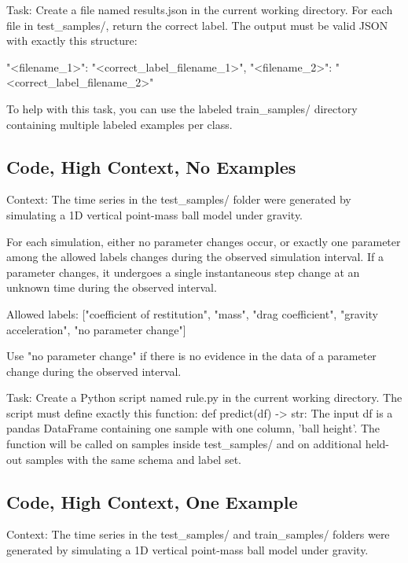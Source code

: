 \documentclass[11pt]{article}
\begin{document}
\begin{DocCode}
\begin{DocCode}
Task:
Create a file named results.json in the current working directory.
For each file in test_samples/, return the correct label.
The output must be valid JSON with exactly this structure:
{

  "<filename_1>": "<correct_label_filename_1>",
  "<filename_2>": "<correct_label_filename_2>"

}

To help with this task, you can use the labeled train_samples/ directory containing multiple labeled examples per class. 
\end{DocCode}

\subsection*{Code, High Context, No Examples}
\begin{DocCode}
Context:
The time series in the test_samples/ folder were generated by simulating a 1D vertical point-mass ball model under gravity.

For each simulation, either no parameter changes occur, or exactly one parameter among the allowed labels changes during the observed simulation interval.
If a parameter changes, it undergoes a single instantaneous step change at an unknown time during the observed interval.

Allowed labels:
["coefficient of restitution", "mass", "drag coefficient", "gravity acceleration", "no parameter change"]

Use "no parameter change" if there is no evidence in the data of a parameter change during the observed interval.

Task:
Create a Python script named rule.py in the current working directory.
The script must define exactly this function:
def predict(df) -> str:
The input df is a pandas DataFrame containing one sample with one column, 'ball height'.
The function will be called on samples inside test_samples/ and on additional held-out samples with the same schema and label set.
\end{DocCode}

\subsection*{Code, High Context, One Example}
\begin{DocCode}
Context:
The time series in the test_samples/ and train_samples/ folders were generated by simulating a 1D vertical point-mass ball model under gravity.


\end{DocCode}
\end{DocCode}
\end{document}
